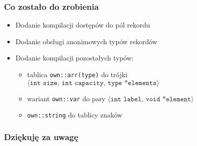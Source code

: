 \documentclass{beamer}
\begin{document}
	\begin{frame}
		\frametitle{Co zostało do zrobienia}
		\begin{itemize}
			\item Dodanie kompilacji dostępów do pól rekordu
			\item Dodanie obsługi anonimowych typów rekordów
			\item Dodanie kompilacji pozostałych typów:
			\begin{itemize}
				\item tablica \texttt{own::arr(type)} do trójki
				$\langle\texttt{int size, int capacity, type *elements}\rangle$
				\item wariant \texttt{own::var} do pary
				$\langle\texttt{int label, void *element}\rangle$
				\item \texttt{own::string} do tablicy znaków
			\end{itemize}
		\end{itemize}
	\end{frame}

	\begin{frame}
	 \frametitle{Dziękuję za uwagę}
	\end{frame}
\end{document}

